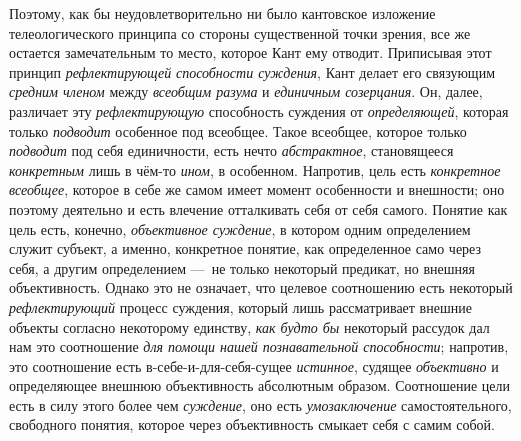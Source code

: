 \documentclass[twoside]{article}
\begin{document}
{{{{Поэтому, как бы неудовлетворительно ни было кантовское
изложение телеологического принципа со стороны существенной точки зрения,
все же остается замечательным то место, которое Кант ему отводит.
Приписывая этот принцип
{\em рефлектирующей}
{\em способности суждения},
Кант делает его связующим
{\em средним членом}
между {\em всеобщим
разума} и {\em единичным
созерцания}. Он, далее, различает эту
{\em рефлектирующую}
способность суждения от
{\em определяющей},
которая только
{\em подводит} особенное
под всеобщее. Такое всеобщее, которое только
{\em подводит} под себя
единичности, есть нечто
{\em абстрактное},
становящееся
{\em конкретным} лишь в
чём-то {\em ином}, в
особенном. Напротив, цель есть
{\em конкретное всеобщее},
которое в себе же самом имеет момент особенности и внешности;
оно поэтому деятельно и есть влечение отталкивать себя от себя самого.
Понятие как цель есть, конечно,
{\em объективное суждение},
в котором одним определением служит субъект, а именно,
конкретное понятие, как определенное само через себя, а другим
определением —~не только некоторый предикат, но внешняя
объективность. Однако это не означает, что целевое соотношению есть
некоторый {\em рефлектирующий}
процесс суждения, который лишь рассматривает внешние объекты
согласно некоторому единству, {\em как
будто бы} некоторый рассудок дал нам это соотношение
{\em для помощи нашей познавательной
способности}; напротив, это соотношение есть
в-себе-и-для-себя-сущее {\em истинное},
судящее {\em объективно}
и определяющее внешнюю объективность абсолютным образом.
Соотношение цели есть в силу этого более чем
{\em суждение}, оно есть
{\em умозаключение}
самостоятельного, свободного понятия, которое через
объективность смыкает себя с самим собой.

}}}}
\end{document}
